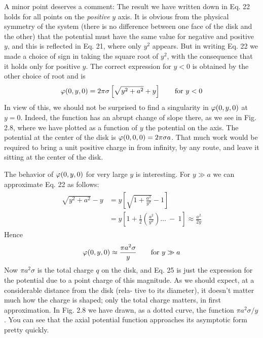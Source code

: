 A minor point deserves a comment: The result we have written
down in Eq. 22 holds for all points on the \emph{positive} $y$ axis. It is obvious
from the physical symmetry of the system (there is no difference between
one face of the disk and the other) that the potential must have
the same value for negative and positive $y$, and this is reflected in
Eq. 21, where only $y^2$ appears. But in writing Eq. 22 we made a
choice of sign in taking the square root of $y^2$, with the consequence
that it holds only for positive $y$. The correct expression for $y < 0$ is
obtained by the other choice of root and is
\begin{equation}
  \varphi(0,y,0) = 2\pi\sigma\left[\sqrt{y^2+a^2}+y\right] \qquad \text{for $y<0$}
\end{equation}
In view of this, we should not be surprised to find a singularity in
$\varphi(0,y,0)$ at $y = 0$. Indeed, the function has an abrupt change of
slope there, as we see in Fig. 2.8, where we have plotted as a function
of $y$ the potential on the axis. The potential at the center of the disk
is $\varphi(0,0,0) = 2\pi\sigma a$. That much work would be required to bring a
unit positive charge in from infinity, by any route, and leave it sitting
at the center of the disk.

The behavior of $\varphi(0,y,0)$ for very large $y$ is interesting. For $y \gg a$
we can approximate Eq. 22 as follows:
\begin{align}
\begin{split}
  \sqrt{y^2+a^2} - y &= y \left[\sqrt{1+\frac{a^2}{y^2}}-1\right] \\
                     &= y \left[1+\frac{1}{2}\left(\frac{a^2}{y^2}\right)\ldots\:-\:1\right]
                                 \approx \frac{a^2}{2y}
\end{split}
\end{align}
Hence
\begin{equation}
  \varphi(0,y,0)\approx \frac{\pi a^2\sigma}{y} \qquad \text{for $y \gg a$}
\end{equation}
Now $\pi a^2\sigma$ is the total charge $q$ on the disk, and Eq. 25 is just the expression
for the potential due to a point charge of this magnitude.
As we should expect, at a considerable distance from the disk (rela-
tive to its diameter), it doesn't matter much how the charge is shaped;
only the total charge matters, in first approximation. In Fig. 2.8 we
have drawn, as a dotted curve, the function $\pi a^2\sigma/y$. You can see that
the axial potential function approaches its asymptotic form pretty
quickly.

